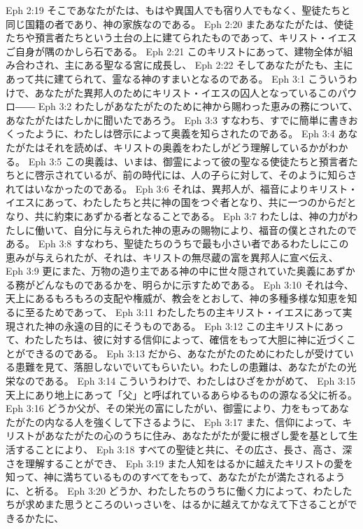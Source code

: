 Eph 2:19  そこであなたがたは、もはや異国人でも宿り人でもなく、聖徒たちと同じ国籍の者であり、神の家族なのである。
Eph 2:20  またあなたがたは、使徒たちや預言者たちという土台の上に建てられたものであって、キリスト・イエスご自身が隅のかしら石である。
Eph 2:21  このキリストにあって、建物全体が組み合わされ、主にある聖なる宮に成長し、
Eph 2:22  そしてあなたがたも、主にあって共に建てられて、霊なる神のすまいとなるのである。
Eph 3:1  こういうわけで、あなたがた異邦人のためにキリスト・イエスの囚人となっているこのパウロ――
Eph 3:2  わたしがあなたがたのために神から賜わった恵みの務について、あなたがたはたしかに聞いたであろう。
Eph 3:3  すなわち、すでに簡単に書きおくったように、わたしは啓示によって奥義を知らされたのである。
Eph 3:4  あなたがたはそれを読めば、キリストの奥義をわたしがどう理解しているかがわかる。
Eph 3:5  この奥義は、いまは、御霊によって彼の聖なる使徒たちと預言者たちとに啓示されているが、前の時代には、人の子らに対して、そのように知らされてはいなかったのである。
Eph 3:6  それは、異邦人が、福音によりキリスト・イエスにあって、わたしたちと共に神の国をつぐ者となり、共に一つのからだとなり、共に約束にあずかる者となることである。
Eph 3:7  わたしは、神の力がわたしに働いて、自分に与えられた神の恵みの賜物により、福音の僕とされたのである。
Eph 3:8  すなわち、聖徒たちのうちで最も小さい者であるわたしにこの恵みが与えられたが、それは、キリストの無尽蔵の富を異邦人に宣べ伝え、
Eph 3:9  更にまた、万物の造り主である神の中に世々隠されていた奥義にあずかる務がどんなものであるかを、明らかに示すためである。
Eph 3:10  それは今、天上にあるもろもろの支配や権威が、教会をとおして、神の多種多様な知恵を知るに至るためであって、
Eph 3:11  わたしたちの主キリスト・イエスにあって実現された神の永遠の目的にそうものである。
Eph 3:12  この主キリストにあって、わたしたちは、彼に対する信仰によって、確信をもって大胆に神に近づくことができるのである。
Eph 3:13  だから、あなたがたのためにわたしが受けている患難を見て、落胆しないでいてもらいたい。わたしの患難は、あなたがたの光栄なのである。
Eph 3:14  こういうわけで、わたしはひざをかがめて、
Eph 3:15  天上にあり地上にあって「父」と呼ばれているあらゆるものの源なる父に祈る。
Eph 3:16  どうか父が、その栄光の富にしたがい、御霊により、力をもってあなたがたの内なる人を強くして下さるように、
Eph 3:17  また、信仰によって、キリストがあなたがたの心のうちに住み、あなたがたが愛に根ざし愛を基として生活することにより、
Eph 3:18  すべての聖徒と共に、その広さ、長さ、高さ、深さを理解することができ、
Eph 3:19  また人知をはるかに越えたキリストの愛を知って、神に満ちているもののすべてをもって、あなたがたが満たされるように、と祈る。
Eph 3:20  どうか、わたしたちのうちに働く力によって、わたしたちが求めまた思うところのいっさいを、はるかに越えてかなえて下さることができるかたに、
